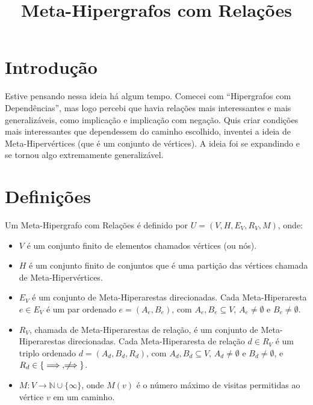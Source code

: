 \documentclass{article}
\title{Meta-Hipergrafos com Relações}
\author{}
\begin{document}
\maketitle

\section{Introdução}

Estive pensando nessa ideia há algum tempo. Comecei com ``Hipergrafos com Dependências'', mas logo percebi que havia relações mais interessantes e mais generalizáveis, como implicação e implicação com negação. Quis criar condições mais interessantes que dependessem do caminho escolhido, inventei a ideia de Meta-Hipervértices (que é um conjunto de vértices). A ideia foi se expandindo e se tornou algo extremamente generalizável.
\\

\section{Definições}

Um Meta-Hipergrafo com Relações é definido por \( U = (V, H, E_V, R_V, M) \), onde:

\begin{itemize}
    \item \( V \) é um conjunto finito de elementos chamados vértices (ou nós).
    \item \( H \) é um conjunto finito de conjuntos que é uma partição das vértices chamada de Meta-Hipervértices.
    \item \( E_V \) é um conjunto de Meta-Hiperarestas direcionadas. Cada Meta-Hiperaresta \( e \in E_V \) é um par ordenado \( e = (A_e, B_e) \), com \( A_e, B_e \subseteq V \), \( A_e \neq \emptyset \) e \( B_e \neq \emptyset \).
    \item \( R_V \), chamada de Meta-Hiperarestas de relação, é um conjunto de Meta-Hiperarestas direcionadas. Cada Meta-Hiperaresta de relação \( d \in R_V \) é um triplo ordenado \( d = (A_d, B_d, R_d) \), com \( A_d, B_d \subseteq V \), \( A_d \neq \emptyset \) e \( B_d \neq \emptyset \), e \( R_d \in \{\implies, \not\!\!\!\implies\} \).
    \item \( M: V \to \mathbb{N} \cup \{\infty\} \), onde \( M(v) \) é o número máximo de visitas permitidas ao vértice \( v \) em um caminho.
\end{itemize}
\end{document}
